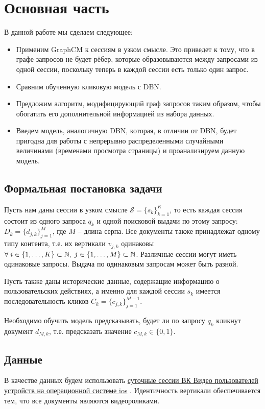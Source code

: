 \documentclass[diploma]{nanolab2015}
\begin{document}
\chapter{Основная часть}
В данной работе мы сделаем следующее:
\begin{itemize}
  \item Применим GraphCM к сессиям в узком смысле. Это приведет к тому, что в графе запросов не будет рёбер, которые образовываются между запросами из одной сессии, поскольку теперь в каждой сессии есть только один запрос.
  \item Сравним обученную кликовую модель с DBN.
  \item Предложим алгоритм, модифицирующий граф запросов таким образом, чтобы обогатить его дополнительной информацией из набора данных.
  \item Введем модель, аналогичную DBN, которая, в отличии от DBN, будет пригодна для работы с непрерывно распределенными случайными величинами (временами просмотра страницы) и проанализируем данную модель.
\end{itemize}
\section{Формальная постановка задачи}
Пусть нам даны сессии в узком смысле $\mathcal{S} = \{s_k\}_{k=1}^K$, то есть каждая сессия состоит из одного запроса $q_k$ и одной поисковой выдачи по этому запросу: $D_k = \{d_{j, k}\}_{j=1}^M$, где $M$ -- длина серпа. Все документы также принадлежат одному типу контента, т.е. их вертикали $v_{j, k}$ одинаковы $\forall \; \space i \in \{1, \dots, K\} \subset \mathbb{N}, \; j \in \{1, \dots, M\} \subset \mathbb{N}$. Различные сессии могут иметь одинаковые запросы. Выдача по одинаковым запросам может быть разной.

Пусть также даны исторические данные, содержащие информацию о пользовательских действиях, а именно для каждой сессии $s_k$ имеется последовательность кликов $C_k = \{c_{j,k}\}_{j=1}^{M-1}$.

Необходимо обучить модель предсказывать, будет ли по запросу $q_k$ кликнут документ $d_{M, k}$, т.е. предсказать значение $c_{M, k} \in \{0, 1\}$.

\section{Данные}
В качестве данных будем использовать \href{https://github.com/agcr/vk-msu-ir-course-spring-2024/blob/055b4329ad60466c238044d3d1d16d2b9c9764d9/seminars/6-behaviour-ranking/iphone-20240201.tsv.gz}{суточные сессии ВК Видео пользователей устройств на операционной системе ios} \cite{vkds}. Идентичность вертикали обеспечивается тем, что все документы являются видеороликами.
\end{document}
